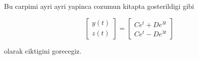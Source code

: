 \documentclass[12pt,fleqn]{article}
\begin{document}
Bu carpimi ayri ayri yapinca cozumun kitapta gosterildigi gibi

\[  
\left[\begin{array}{r}
y(t) \\
z(t)
\end{array}\right]
=
\left[\begin{array}{r}
Ce^t + De^{3t} \\
Ce^t - De^{3t} 
\end{array}\right]
\]

olarak ciktigini gorecegiz. 
\end{document}

